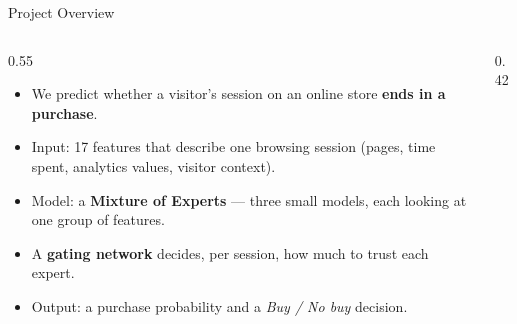 \documentclass[aspectratio=169,11pt]{beamer}
\begin{document}
\begin{frame}{Project Overview}
  \begin{columns}[T,onlytextwidth]
    \begin{column}{0.55\textwidth}
      \begin{itemize}\setlength{\itemsep}{6pt}
        \item We predict whether a visitor's session on an online store \textbf{ends in a purchase}.
        \item Input: 17 features that describe one browsing session (pages, time spent, analytics values, visitor context).
        \item Model: a \textbf{Mixture of Experts} --- three small models, each looking at one group of features.
        \item A \textbf{gating network} decides, per session, how much to trust each expert.
        \item Output: a purchase probability and a \emph{Buy / No buy} decision.
      \end{itemize}
    \end{column}
    \begin{column}{0.42\textwidth}
      \centering
    \end{column}
  \end{columns}
\end{frame}
\end{document}
